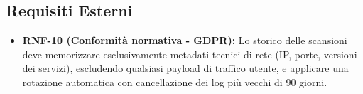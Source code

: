 \documentclass{article}
\begin{document}
\subsection{Requisiti Esterni}
\begin{itemize}
    \item \textbf{RNF-10 (Conformità normativa - GDPR):} Lo storico delle scansioni deve memorizzare esclusivamente metadati tecnici di rete (IP, porte, versioni dei servizi), escludendo qualsiasi payload di traffico utente, e applicare una rotazione automatica con cancellazione dei log più vecchi di 90 giorni.
\end{itemize}


\newpage






\end{document}
